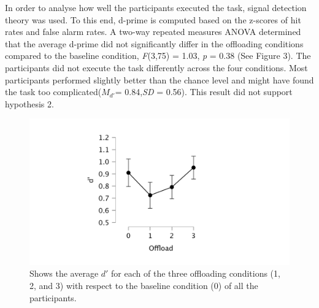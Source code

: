 \documentclass[
    a4paper,
    man,
    floatsintext,
    british
]{apa6}
\begin{document}
In order to analyse how well the participants executed the task, signal detection theory was used. To this end, d-prime is computed based on the z-scores of hit rates and false alarm rates. A two-way repeated measures ANOVA determined that the average d-prime did not significantly differ in the offloading conditions compared to the baseline condition, \textit{F}(3,75) = 1.03, \textit{p} = 0.38 (See Figure 3). The participants did not execute the task differently across the four conditions. Most participants performed slightly better than the chance level and might have found the task too complicated(\textit{$M_{d'}$}= 0.84,\textit{SD} = 0.56). This result did not support hypothesis 2.
\begin{figure}[hbt!]
    \centering
    \includegraphics[scale = 0.2]{dprime.jpeg}
    \caption{Shows the average \textit{$d'$} for each of the three offloading conditions (1, 2, and 3) with respect to the baseline condition (0) of all the participants.}
    \label{fig:dprime}
\end{figure}

\newpage
\end{document}
